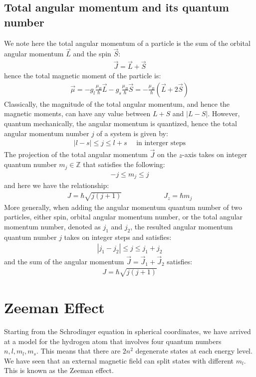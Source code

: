 \documentclass[11pt]{article}
\theoremstyle{break}
\theoremstyle{break}
\newcommand{\Z}{\mathbb{Z}}
\begin{document}
\subsection{Total angular momentum and its quantum number}
We note here the total angular momentum of a particle is the sum of the orbital angular momentum $\vec{L}$ and the spin $\vec{S}$:
\begin{align*}
\vec{J} = \vec{L} + \vec{S}
\end{align*}
hence the total magnetic moment of the particle is:
\begin{align*}
\vec{\mu} = -g_l \frac{\mu_B}{\hbar}\vec{L} - g_s \frac{\mu_B}{\hbar}\vec{S} = -\frac{\mu_B}{\hbar}(\vec{L}+ 2\vec{S})
\end{align*}
Classically, the magnitude of the total angular momentum,
and hence the magnetic moments, can have any value between $L + S$ and $|L - S|$. However, quantum mechanically, the angular momentum is quantized, hence the total angular momentum number $j$ of a system is given by:
\begin{align*}
|l-s| \leq j \leq l+s \quad\text{ in interger steps}
\end{align*}
The projection of the total angular momentum $\vec{J}$ on the $z$-axis takes on integer quantum number $m_j \in \Z$ that satisfies the following:
\begin{align*}
-j\leq m_j \leq j
\end{align*}
and here we have the relationship:
\begin{align*}
J = \hbar\sqrt{j(j+1)} \qquad\qquad\qquad J_z = \hbar m_j 
\end{align*}
More generally, when adding the angular momentum quantum number of two particles, either spin, orbital angular momentum number, or the total angular momentum number, denoted as $j_1$ and $j_2$, the resulted angular momentum quantum number $j$ takes on integer steps and satisfies:
\begin{align*}
|j_1-j_2| \leq j \leq j_1+j_2
\end{align*} 
and the sum of the angular momentum $\vec{J} = \vec{J}_1 + \vec{J}_2$ satisfies:
\begin{align*}
J = \hbar \sqrt{j(j+1)}
\end{align*}

\newpage
\section{Zeeman Effect}
Starting from the Schrodinger equation in spherical coordinates, we have arrived at a model for the hydrogen atom that involves four quantum numbers $n, l, m_l, m_s$. 
This means that there are $2n^2$ degenerate states at each energy level. We have seen that an external magnetic field can split states with different $m_l$. This is known as the Zeeman effect. \\
\end{document}
